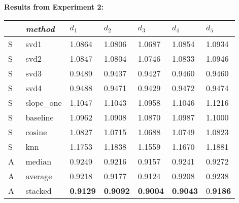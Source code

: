 \begin{table}[p]
  \centering

  \textbf{Results from Experiment 2:}

  \vspace{2em}

  \begin{tabular*}{\textwidth}{ l p{3cm} p{1.5cm} p{1.5cm} p{1.5cm} p{1.5cm} p{1.5cm} }
    \toprule
      ~ & \emph{method} & 
      $d_1$ & $d_2$ & $d_3$ & $d_4$ & $d_5$ \\ 
    \midrule
    S & svd1       &   1.0864  &  1.0806  &  1.0687  &  1.0854  &  1.0934  \\
    S & svd2       &   1.0847  &  1.0804  &  1.0746  &  1.0833  &  1.0946  \\
    S & svd3       &   0.9489  &  0.9437  &  0.9427  &  0.9460  &  0.9460  \\
    S & svd4       &   0.9488  &  0.9471  &  0.9429  &  0.9472  &  0.9474  \\
    S & slope\_one &   1.1047  &  1.1043  &  1.0958  &  1.1046  &  1.1216  \\
    S & baseline   &   1.0962  &  1.0908  &  1.0870  &  1.0987  &  1.1000  \\
    S & cosine     &   1.0827  &  1.0715  &  1.0688  &  1.0749  &  1.0823  \\
    S & knn        &   1.1753  &  1.1838  &  1.1559  &  1.1670  &  1.1881  \\
    \midrule
    A & median     &   0.9249  &  0.9216  &  0.9157  &  0.9241  &  0.9272  \\    
    A & average    &   0.9218  &  0.9177  &  0.9124  &  0.9208  &  0.9238  \\
    A & stacked    &   \textbf{0.9129}  &  \textbf{0.9092}  &  \textbf{0.9004}  &  \textbf{0.9043}  &  0.\textbf{9186}  \\    
    \bottomrule
  \end{tabular*}

  \vspace{2em}


\end{table}
